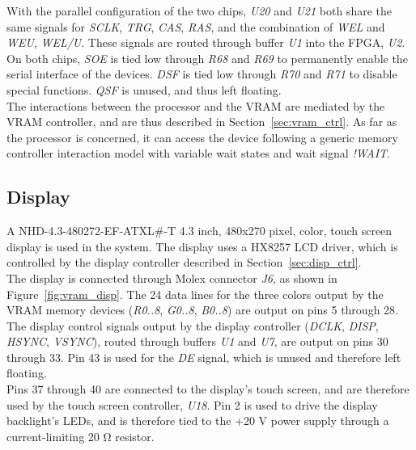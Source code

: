 \documentclass[titlepage]{scrartcl}
\begin{document}
	With the parallel configuration of the two chips, \textit{U20} and \textit{U21} both share the same signals for \textit{SCLK}, \textit{TRG}, \textit{CAS}, \textit{RAS}, and the combination of \textit{WEL} and \textit{WEU}, \textit{WEL/U}. These signals are routed through buffer \textit{U1} into the FPGA, \textit{U2}.\\

	On both chips, \textit{SOE} is tied low through \textit{R68} and \textit{R69} to permanently enable the serial interface of the devices. \textit{DSF} is tied low through \textit{R70} and \textit{R71} to disable special functions. \textit{QSF} is unused, and thus left floating.\\

	The interactions between the processor and the VRAM are mediated by the VRAM controller, and are thus described in Section~\ref{sec:vram_ctrl}. As far as the processor is concerned, it can access the device following a generic memory controller interaction model with variable wait states and wait signal \textit{!WAIT}. \\

	\clearpage

	\subsection{Display}
	A NHD-4.3-480272-EF-ATXL\#-T 4.3 inch, 480x270 pixel, color, touch screen display is used in the system. The display uses a HX8257 LCD driver, which is controlled by the display controller described in Section~\ref{sec:disp_ctrl}.\\

	The display is connected through Molex connector \textit{J6}, as shown in Figure~\ref{fig:vram_disp}. The 24 data lines for the three colors output by the VRAM memory devices (\textit{R0..8}, \textit{G0..8}, \textit{B0..8}) are output on pins 5 through 28. The display control signals output by the display controller (\textit{DCLK}, \textit{DISP}, \textit{HSYNC}, \textit{VSYNC}), routed through buffers \textit{U1} and \textit{U7}, are output on pins 30 through 33. Pin 43 is used for the \textit{DE} signal, which is unused and therefore left floating.\\

	Pins 37 through 40 are connected to the display's touch screen, and are therefore used by the touch screen controller, \textit{U18}. Pin 2 is used to drive the display backlight's LEDs, and is therefore tied to the +20 V power supply through a current-limiting 20 Ω resistor.\\
\end{document}
